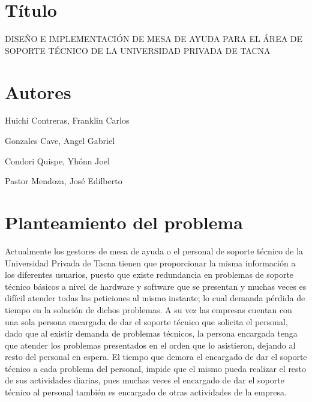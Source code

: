 \documentclass[preprint,12pt]{elsarticle}
\begin{document}

\section{Título}

DISEÑO E IMPLEMENTACIÓN DE MESA DE AYUDA PARA EL ÁREA DE SOPORTE TÉCNICO DE LA UNIVERSIDAD PRIVADA DE TACNA



\section{Autores}
Huichi Contreras, Franklin Carlos 

Gonzales Cave, Angel Gabriel

Condori Quispe, Yhónn Joel	
 
Pastor Mendoza, José Edilberto




\section{Planteamiento del problema}
Actualmente los gestores de mesa de ayuda o el personal de soporte técnico de la Universidad Privada de Tacna tienen que proporcionar la misma información a los diferentes usuarios, puesto que existe redundancia en problemas de soporte técnico básicos a nivel de hardware y software que se presentan y muchas veces es difícil atender todas las peticiones al mismo instante; lo cual demanda pérdida de tiempo en la solución de dichos problemas. A su vez las empresas  cuentan con una sola persona encargada de dar el soporte técnico que solicita el personal, dado que al existir demanda de problemas técnicos, la persona encargada tenga que atender los problemas presentados en el orden que lo asistieron, dejando al resto del personal en espera. El tiempo que demora el encargado de dar el soporte técnico a cada problema del personal, impide que el mismo pueda realizar el resto de sus actividades diarias, pues muchas veces el encargado de dar el soporte técnico al personal también es encargado de otras actividades de la empresa. 
\end{document}
